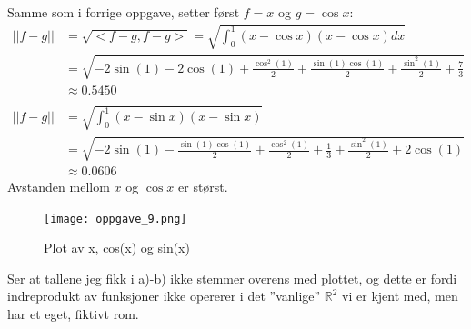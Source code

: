 \documentclass[11pt, a4paper, norsk]{NTNUoving}
\begin{document}
\begin{oppgave}
\begin{punkt}
            Samme som i forrige oppgave, setter først $f=x$ og $g=\cos{x}$:
            \begin{align*}
                ||f-g|| &= \sqrt{<f-g, f-g>} = \sqrt{\int_{0}^{1}(x-\cos{x})(x-\cos{x})dx}
                \\
                        &= \sqrt{- 2 \sin{\left(1 \right)} - 2 \cos{\left(1 \right)} + \frac{\cos^{2}{\left(1 \right)}}{2} + \frac{\sin{\left(1 \right)} \cos{\left(1 \right)}}{2} + \frac{\sin^{2}{\left(1 \right)}}{2} + \frac{7}{3}}
                        \\
                        &\approx 0.5450
                        \\
                        \\
                ||f-g|| &= \sqrt{\int_{0}^{1}(x-\sin{x})(x-\sin{x})}
                \\
                        &= \sqrt{- 2 \sin{\left(1 \right)} - \frac{\sin{\left(1 \right)} \cos{\left(1 \right)}}{2} + \frac{\cos^{2}{\left(1 \right)}}{2} + \frac{1}{3} + \frac{\sin^{2}{\left(1 \right)}}{2} + 2 \cos{\left(1 \right)}}
                        \\
                        &\approx 0.0606
            \end{align*}
            Avstanden mellom $x$ og $\cos{x}$ er størst. 
        \end{punkt}
        \begin{punkt}
            \begin{figure}[!ht]
                \centering
                \texttt{[image: oppgave\_9.png]}
        \caption{Plot av x, cos(x) og sin(x)}
                \label{fig:_9}
            \end{figure}
            Ser at tallene jeg fikk i a)-b) ikke stemmer overens med plottet, og dette er fordi indreprodukt av funksjoner ikke opererer i det ''vanlige'' $\mathbb{R}^2$ vi er kjent med, men har et eget, fiktivt rom.
        \end{punkt}
    \end{oppgave}
\end{document}
